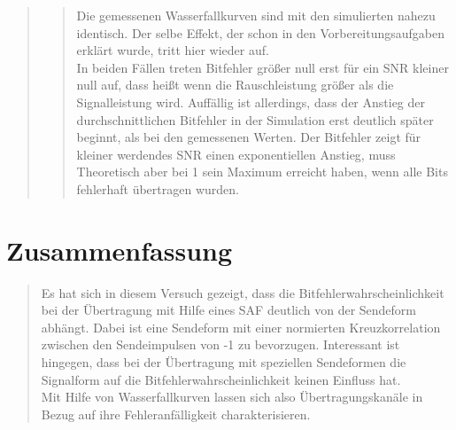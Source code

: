 \begin{quote}
\begin{quote}
       \vspace{2em}    
    
    Die gemessenen Wasserfallkurven sind mit den simulierten nahezu identisch. Der selbe Effekt, der schon in den
    Vorbereitungsaufgaben erklärt wurde, tritt hier wieder auf.\\
    In beiden Fällen treten Bitfehler größer null erst für ein SNR kleiner null auf, dass heißt
    wenn die Rauschleistung größer als die Signalleistung wird. Auffällig ist allerdings, dass der Anstieg der
    durchschnittlichen Bitfehler in der Simulation erst deutlich später beginnt, als bei den gemessenen Werten.
    Der Bitfehler zeigt für kleiner werdendes SNR einen exponentiellen Anstieg, muss Theoretisch aber bei 1 sein Maximum
    erreicht haben, wenn alle Bits fehlerhaft übertragen wurden.
    
    \end{quote}
     
\end{quote}

\section{Zusammenfassung}
\begin{quote}
	
	Es hat sich in diesem Versuch gezeigt, dass die Bitfehlerwahrscheinlichkeit bei der Übertragung mit Hilfe eines SAF
	deutlich von der Sendeform abhängt. Dabei ist eine Sendeform mit einer normierten Kreuzkorrelation zwischen den
	Sendeimpulsen von -1 zu bevorzugen. Interessant ist hingegen, dass bei der Übertragung mit speziellen Sendeformen die
	Signalform auf die Bitfehlerwahrscheinlichkeit keinen Einfluss hat.\\
	Mit Hilfe von Wasserfallkurven lassen sich also Übertragungskanäle in Bezug auf ihre Fehleranfälligkeit
	charakterisieren.
 
    
\end{quote} %



\newpage

